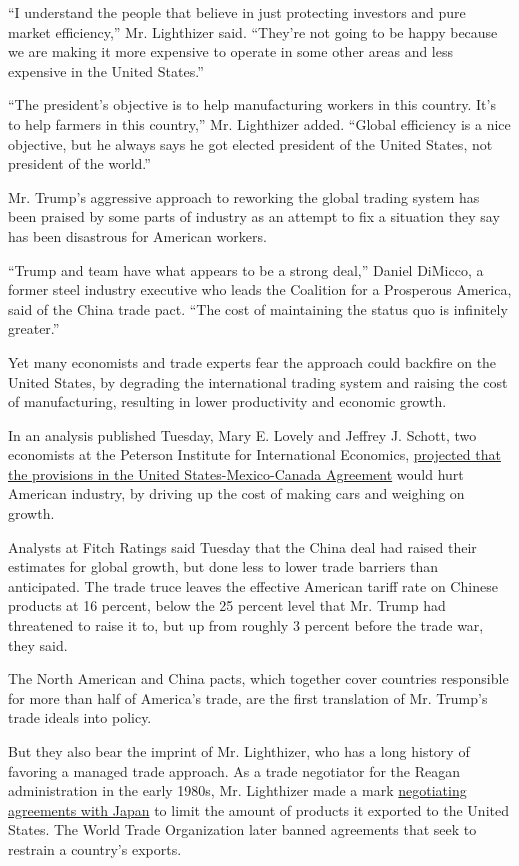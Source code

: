 ``I understand the people that believe in just protecting investors and
pure market efficiency,'' Mr. Lighthizer said. ``They're not going to be
happy because we are making it more expensive to operate in some other
areas and less expensive in the United States.''

``The president's objective is to help manufacturing workers in this
country. It's to help farmers in this country,'' Mr. Lighthizer added.
``Global efficiency is a nice objective, but he always says he got
elected president of the United States, not president of the world.''

Mr. Trump's aggressive approach to reworking the global trading system
has been praised by some parts of industry as an attempt to fix a
situation they say has been disastrous for American workers.

``Trump and team have what appears to be a strong deal,'' Daniel
DiMicco, a former steel industry executive who leads the Coalition for a
Prosperous America, said of the China trade pact. ``The cost of
maintaining the status quo is infinitely greater.''

Yet many economists and trade experts fear the approach could backfire
on the United States, by degrading the international trading system and
raising the cost of manufacturing, resulting in lower productivity and
economic growth.

In an analysis published Tuesday, Mary E. Lovely and Jeffrey J. Schott,
two economists at the Peterson Institute for International Economics,
\href{https://www.piie.com/blogs/trade-and-investment-policy-watch/usmca-new-modestly-improved-still-costly}{projected
that the provisions in the United States-Mexico-Canada Agreement} would
hurt American industry, by driving up the cost of making cars and
weighing on growth.

Analysts at Fitch Ratings said Tuesday that the China deal had raised
their estimates for global growth, but done less to lower trade barriers
than anticipated. The trade truce leaves the effective American tariff
rate on Chinese products at 16 percent, below the 25 percent level that
Mr. Trump had threatened to raise it to, but up from roughly 3 percent
before the trade war, they said.

The North American and China pacts, which together cover countries
responsible for more than half of America's trade, are the first
translation of Mr. Trump's trade ideals into policy.

But they also bear the imprint of Mr. Lighthizer, who has a long history
of favoring a managed trade approach. As a trade negotiator for the
Reagan administration in the early 1980s, Mr. Lighthizer made a mark
\href{https://www.nytimes.com/1984/09/30/business/the-steel-trade-negotiations-the-experts-who-will-forge-the-new-quotas.html}{negotiating
agreements with Japan} to limit the amount of products it exported to
the United States. The World Trade Organization later banned agreements
that seek to restrain a country's exports.

